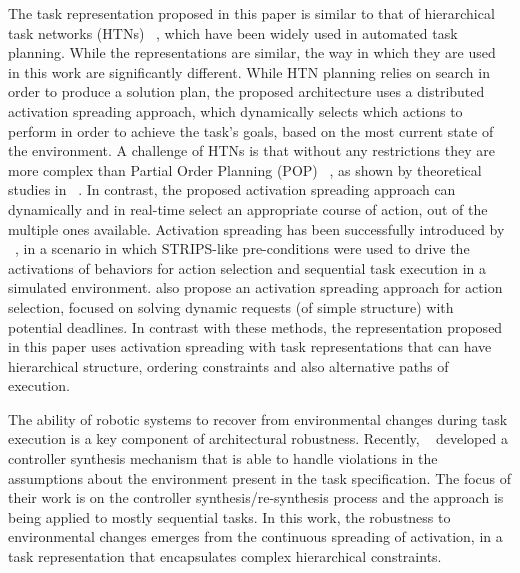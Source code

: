 \documentclass[conference]{article}
\begin{document}
The task representation proposed in this paper is similar to that of hierarchical task networks (HTNs) ~\cite{erol1994umcp}, which have been widely used in automated task planning. While the representations are similar, the way in which they are used in this work are significantly different. While HTN planning relies on search in order to produce a solution plan, the proposed architecture uses a distributed activation spreading approach, which dynamically selects which actions to perform in order to achieve the task's goals, based on the most current state of the environment. 
A challenge of HTNs is that without any restrictions they are more complex than Partial Order Planning (POP) ~\cite{penberthy1992ucpop}, as shown by theoretical studies in ~\cite{erol1994htn}. In contrast, the proposed activation spreading approach can dynamically and in real-time select an appropriate course of action, out of the multiple ones available. Activation spreading has been successfully introduced by ~\cite{maes1989right}, in a scenario in which STRIPS-like pre-conditions were used to drive the activations of behaviors for action selection and sequential task execution in a simulated environment. 
\cite{Towle2014} also propose an activation spreading approach for action selection, focused on solving dynamic requests (of simple structure) with potential deadlines. In contrast with these methods, the representation proposed in this paper uses activation spreading with task representations that can have hierarchical structure, ordering constraints and also alternative paths of execution. 

The ability of robotic systems to recover from environmental changes during task execution is a key component of architectural robustness. Recently, ~\cite{Wong-RSS-14} developed a controller synthesis mechanism that is able to handle violations in the assumptions about the environment present in the task specification. The focus of their work is on the controller synthesis/re-synthesis process and the approach is being applied to mostly sequential tasks. In this work, the robustness to environmental changes emerges from the continuous spreading of activation, in a task representation that encapsulates complex hierarchical constraints.
\end{document}
